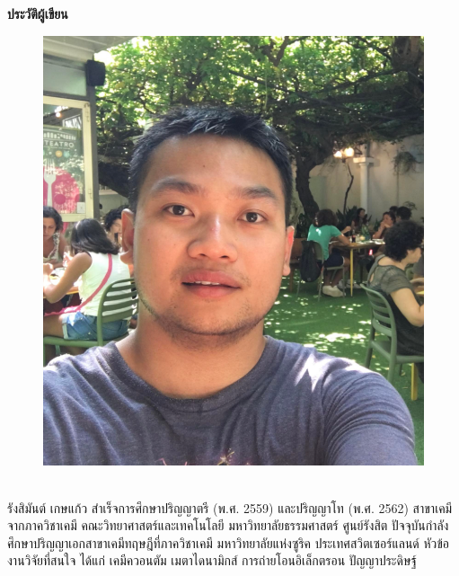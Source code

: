 

{
\thispagestyle{empty}

\begin{center}
    \LARGE\textbf{ประวัติผู้เขียน}
\end{center}

\begin{minipage}[t][8cm][t]{\textwidth}
    \begin{figure}
        \includegraphics[width=0.9\linewidth]{fig/RK.png}
    \end{figure}
    \leavevmode
    \\
    \hspace*{1em} รังสิมันต์ เกษแก้ว สำเร็จการศึกษาปริญญาตรี (พ.ศ. 2559) และปริญญาโท (พ.ศ. 2562) สาขาเคมี จากภาควิชาเคมี 
    คณะวิทยาศาสตร์และเทคโนโลยี มหาวิทยาลัยธรรมศาสตร์ ศูนย์รังสิต ปัจจุบันกำลังศึกษาปริญญาเอกสาขาเคมีทฤษฎีที่ภาควิชาเคมี 
    มหาวิทยาลัยแห่งซูริค ประเทศสวิตเซอร์แลนด์ หัวข้องานวิจัยที่สนใจ ได้แก่ เคมีควอนตัม เมตาไดนามิกส์ การถ่ายโอนอิเล็กตรอน ปัญญาประดิษฐ์ 

\end{minipage}}
